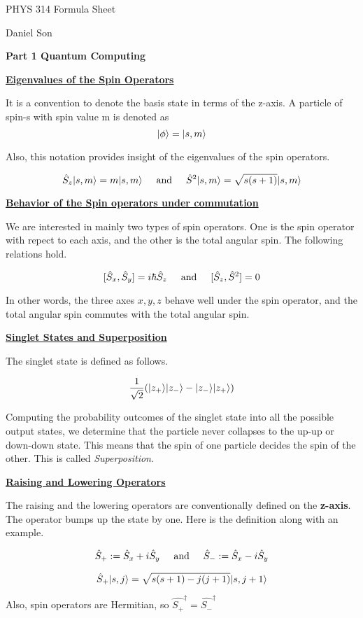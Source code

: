 \documentclass{article}
\DeclarePairedDelimiter\ket{\lvert}{\rangle}
\newcommand{\new}[1]{
    \vspace{2mm}
    \noindent
    \textbf{
    \underline{#1}}
}
\newcommand{\textAnd}{
    {
        \hspace{5mm}
        \textrm{and}
        \hspace{5mm}
    }
}
\begin{document}
\begin{center}
\LARGE
PHYS 314 Formula Sheet

\Large
Daniel Son
\end{center}


\LARGE
\noindent
\textbf{Part 1 Quantum Computing}
\normalsize

\new{Eigenvalues of the Spin Operators}
It is a convention to denote the basis state in 
terms of the z-axis. A particle of spin-s with 
spin value m is denoted as 
\[
    \ket{\phi} = \ket{s, m}
\]

Also, this notation provides insight of the 
eigenvalues of the spin operators. 

\[
    \hat{S}_z\ket{s, m} = m \ket{s, m}
    \textAnd 
    \hat{S}^2\ket{s, m} = \sqrt{s(s+1)} \ket{s, m}
\]

\new{Behavior of the Spin operators under commutation}
We are interested in mainly two types of spin operators. 
One is the spin operator with repect to each axis, 
and the other is the total angular spin. The following 
relations hold. 

\[
    [\hat{S}_x, \hat{S}_y] = i\hbar \hat{S}_z
    \textAnd 
    [\hat{S}_z, \hat{S}^2] = 0
\]

In other words, the three axes $x, y, z$ behave well 
under the spin operator, and the total angular 
spin commutes with the total angular spin. 

\new{Singlet States and Superposition}

The singlet state is defined as follows.

\[
    \frac{1}{\sqrt{2}}
    (\ket{z_+}\ket{z_-} - \ket{z_-} \ket{z_+})
\]

Computing the probability outcomes of the singlet state 
into all the possible output states, we determine that 
the particle never collapses to the up-up or down-down state. 
This means that the spin of one particle decides the spin of the other. 
This is called \textit{Superposition}. 

\new{Raising and Lowering Operators}
The raising and the lowering operators are conventionally 
defined on the \textbf{z-axis}. The operator bumps up 
the state by one. Here is the definition along with an example. 

\[
    \hat{S}_+ := \hat{S}_x + i\hat{S}_y
    \textAnd 
    \hat{S}_- := \hat{S}_x - i\hat{S}_y
\]

\[
    \hat{S}_+ \ket{s, j} = 
    \sqrt{s(s + 1) - j(j + 1)}
    \ket{s, j + 1}
\]

Also, spin operators are Hermitian, so $\hat{S_+}^\dag = \hat{S_-}^\dag$
\end{document}

